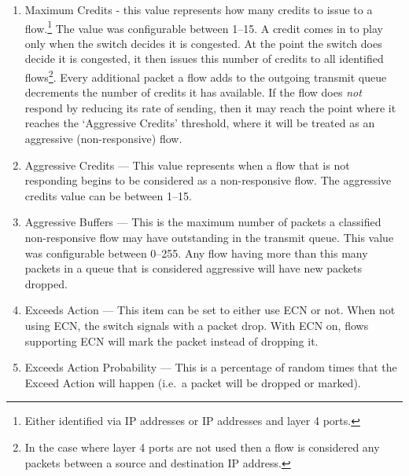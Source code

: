 \documentclass[12pt]{article}
\begin{document}
\begin{enumerate}

\item Maximum Credits - this value represents how many credits to issue to a
flow.\footnote{Either identified via IP addresses or IP addresses and layer 4 ports.}
The value was configurable between 1--15. A credit comes in to play only when
the switch decides it is congested. At the point the switch does decide it is
congested, it then issues this number of credits to all identified flows\footnote{In the
case where layer 4 ports are not used then a flow is considered any packets between
a source and destination IP address.}. Every additional packet a flow adds to the outgoing
transmit queue decrements the number of credits it has available. If the flow does \emph{not}
respond by reducing its rate of sending, then it may reach the point where it reaches the `Aggressive
Credits' threshold, where it will be treated as an aggressive (non-responsive) flow.


\item Aggressive Credits --- This value represents when a flow that is not responding begins
to be considered as a non-responsive flow. The aggressive credits value
can be between 1--15.

\item Aggressive Buffers --- This is the maximum number of packets a classified non-responsive
flow may have outstanding in the transmit queue. This value was configurable  between 0--255.
Any flow having more than this many packets in a queue that is considered aggressive will have
new packets dropped.

\item Exceeds Action --- This item can be set to either use ECN or not. When not
using ECN, the switch signals with a packet drop. With ECN on, flows supporting
ECN will mark the packet instead of dropping it.

\item Exceeds Action Probability --- This is a percentage of random times that the Exceed
Action will happen (i.e.~a packet will be dropped or marked).

\end{enumerate}
\end{document}

